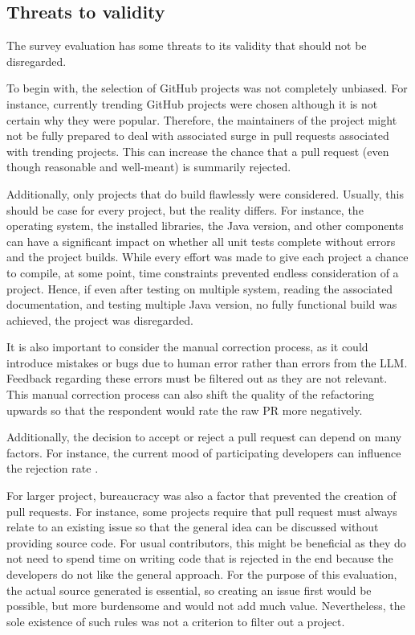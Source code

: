 \subsection{Threats to validity}

The survey evaluation has some threats to its validity that should not be disregarded.

To begin with, the selection of GitHub projects was not completely unbiased. For instance, currently trending GitHub projects were chosen although it is not certain why they were popular. Therefore, the maintainers of the project might not be fully prepared to deal with associated surge in pull requests associated with trending projects. This can increase the chance that a pull request (even though reasonable and well-meant) is summarily rejected. \cite{10.1145/3366423.3380272}

Additionally, only projects that do build flawlessly were considered. Usually, this should be case for every project, but the reality differs. For instance, the operating system, the installed libraries, the Java version, and other components can have a significant impact on whether all unit tests complete without errors and the project builds.  While every effort was made to give each project a chance to compile, at some point, time constraints prevented endless consideration of a project. Hence, if even after testing on multiple system, reading the associated documentation, and testing multiple Java version, no fully functional build was achieved, the project was disregarded.

It is also important to consider the manual correction process, as it could introduce mistakes or bugs due to human error rather than errors from the \ac{LLM}. Feedback regarding these errors must be filtered out as they are not relevant. This manual correction process can also shift the quality of the refactoring upwards so that the respondent would rate the raw PR more negatively. 


Additionally, the decision to accept or reject a pull request can depend on many factors. For instance, the current mood of participating developers can influence the rejection rate \cite{detecting_emotional}.

For larger project, bureaucracy was also a factor that prevented the creation of pull requests. For instance, some projects require that pull request must always relate to an existing issue so that the general idea can be discussed without providing source code. For usual contributors, this might be beneficial as they do not need to spend time on writing code that is rejected in the end because the developers do not like the general approach. For the purpose of this evaluation, the actual source generated is essential, so creating an issue first would be possible,  but more burdensome  and would not add much value. Nevertheless, the sole existence of such rules was not a criterion to filter out a project. 

